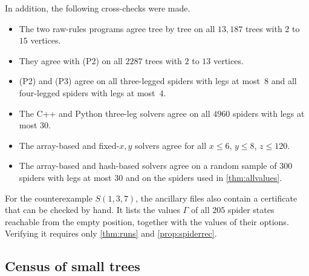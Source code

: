 \documentclass[11pt]{amsart}
\theoremstyle{definition}
\theoremstyle{remark}
\newcommand{\Sp}{S}
\begin{document}
\noindent In addition, the following cross-checks were made.
\begin{itemize}[leftmargin=*]
\item The two raw-rules programs agree tree by tree on all $13{,}187$ trees with $2$ to $15$ vertices.
\item They agree with (P2) on all $2287$ trees with $2$ to $13$ vertices.
\item (P2) and (P3) agree on all three-legged spiders with legs at most~$8$ and all four-legged spiders with legs at most~$4$.
\item The C++ and Python three-leg solvers agree on all $4960$ spiders with legs at most $30$.
\item The array-based and fixed-$x,y$ solvers agree for all $x\le6$, $y\le 8$, $z\le120$.
\item The array-based and hash-based solvers agree on a random sample of $300$ spiders with legs at most $30$ and on the spiders used in \cref{thm:allvalues}.
\end{itemize}
For the counterexample $\Sp(1,3,7)$, the ancillary files also contain a certificate that can be checked by hand. It lists the values $\Gamma$ of all $205$ spider states reachable from the empty position, together with the values of their options. Verifying it requires only \cref{thm:runs} and \cref{prop:spiderrec}.

\subsection{Census of small trees}
\end{document}
